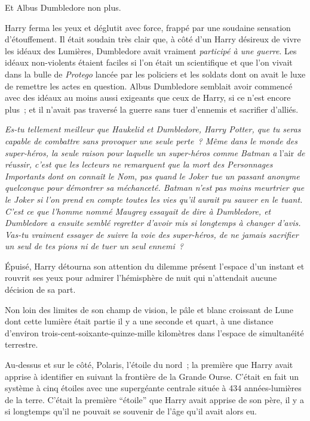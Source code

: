 Et Albus Dumbledore non plus.

Harry ferma les yeux et déglutit avec force, frappé par une soudaine sensation d'étouffement.
Il était soudain très clair que, à côté d'un Harry désireux de vivre les idéaux des Lumières, Dumbledore avait vraiment \emph{participé à une guerre}.
Les idéaux non-violents étaient faciles si l'on était un scientifique et que l'on vivait dans la bulle de \emph{Protego} lancée par les policiers et les soldats dont on avait le luxe de remettre les actes en question.
Albus Dumbledore semblait avoir commencé avec des idéaux au moins aussi exigeants que ceux de Harry, si ce n'est encore plus~; et il n'avait pas traversé la guerre sans tuer d'ennemis et sacrifier d'alliés.

\emph{Es-tu tellement meilleur que Haukelid et Dumbledore, Harry Potter, que tu seras capable de combattre sans provoquer une seule perte~?
Même dans le monde des super-héros, la seule raison pour laquelle un super-héros comme Batman a} l'air \emph{de réussir, c'est que les lecteurs ne remarquent que la mort des Personnages Importants dont on connaît le Nom, pas quand le Joker tue un passant anonyme quelconque pour démontrer sa méchanceté.
Batman n'est pas moins meurtrier que le Joker si l'on prend en compte toutes les vies qu'il aurait pu sauver en le tuant.
C'est ce que l'homme nommé Maugrey essayait de dire à Dumbledore, et Dumbledore a ensuite semblé regretter d'avoir mis si longtemps à changer d'avis.
Vas-tu vraiment essayer de suivre la voie des super-héros, de ne jamais sacrifier un seul de tes pions ni de tuer un seul ennemi~?}

Épuisé, Harry détourna son attention du dilemme présent l'espace d'un instant et rouvrit ses yeux pour admirer l'hémisphère de nuit qui n'attendait aucune décision de sa part.

Non loin des limites de son champ de vision, le pâle et blanc croissant de Lune dont cette lumière était partie il y a une seconde et quart, à une distance d'environ trois-cent-soixante-quinze-mille kilomètres dans l'espace de simultanéité terrestre.

Au-dessus et sur le côté, Polaris, l'étoile du nord~; la première que Harry avait apprise à identifier en suivant la frontière de la Grande Ourse.
C'était en fait un système à cinq étoiles avec une supergéante centrale située à 434 années-lumières de la terre.
C'était la première “étoile” que Harry avait apprise de son père, il y a si longtemps qu'il ne pouvait se souvenir de l'âge qu'il avait alors eu.

